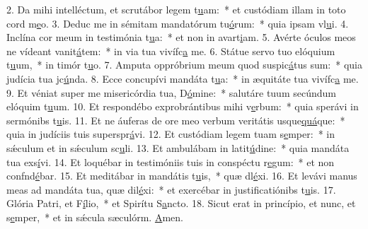 2. Da mihi intelléctum, et scrutábor legem t\uline{u}am:~* et custódiam illam in toto cord m\uline{e}o.
3. Deduc me in sémitam mandatórum tu\uline{ó}rum:~* quia ipsam vl\uline{u}i.
4. Inclína cor meum in testimónia t\uline{u}a:~* et non in avart\uline{i}am.
5. Avérte óculos meos ne vídeant vanit\uline{á}tem:~* in via tua vivífc\uline{a} me.
6. Státue servo tuo elóquium t\uline{u}um,~* in timór t\uline{u}o.
7. Amputa oppróbrium meum quod suspic\uline{á}tus sum:~* quia judícia tua jc\uline{ú}nda.
8. Ecce concupívi mandáta t\uline{u}a:~* in æquitáte tua vivífc\uline{a} me.
9. Et véniat super me misericórdia tua, D\uline{ó}mine:~* salutáre tuum secúndum elóquim t\uline{u}um.
10. Et respondébo exprobrántibus mihi v\uline{e}rbum:~* quia sperávi in sermónibs t\uline{u}is.
11. Et ne áuferas de ore meo verbum veritátis usque\uline{quá}que:~* quia in judíciis tuis superspr\uline{á}vi.
12. Et custódiam legem tuam s\uline{e}mper:~* in sǽculum et in sǽculum sc\uline{u}li.
13. Et ambulábam in latit\uline{ú}dine:~* quia mandáta tua exs\uline{í}vi.
14. Et loquébar in testimóniis tuis in conspéctu r\uline{e}gum:~* et non confnd\uline{é}bar.
15. Et meditábar in mandátis t\uline{u}is,~* quæ dl\uline{é}xi.
16. Et levávi manus meas ad mandáta tua, quæ dil\uline{é}xi:~* et exercébar in justificatiónibs t\uline{u}is.
17. Glória Patri, et F\uline{í}lio,~* et Spirítu S\uline{a}ncto.
18. Sicut erat in princípio, et nunc, et s\uline{e}mper,~* et in sǽcula sæculórm. \uline{A}men.
